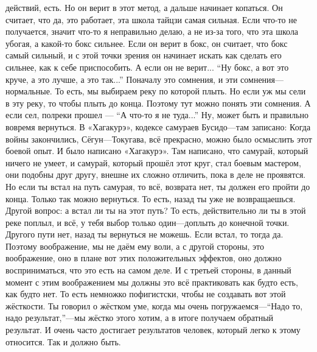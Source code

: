 действий, есть. Но он верит
в этот метод, а дальше начинает копаться. Он считает, что да, это работает, эта школа тайцзи
самая сильная. Если
что-то не получается, значит что-то я неправильно делаю, а не из-за того, что эта школа убогая, а
какой-то бокс сильнее.
Если он верит в бокс, он считает, что бокс самый сильный, и с этой точки зрения он начинает искать
как сделать его
сильнее, как к себе приспособить. А если он не верит... ``Ну бокс, а вот это круче, а это лучше, а
это так...''
Поначалу это
сомнения, и эти сомнения---нормальные. То есть, мы выбираем реку по которой плыть. Но если
уж мы сели в эту
реку, то чтобы плыть до конца. Поэтому тут можно понять эти сомнения.
А если сел, полреки
прошел --- ``А что-то я не туда...''\hfil\break
\indent
Ну, может быть и правильно вовремя вернуться. В «Хагакурэ», кодексе самураев Бусидо---там
записано: Когда
войны закончились, Сёгун---Токугава, всё прекрасно, можно было осмыслить этот боевой опыт. И было
написано «Хагакурэ».
Там написано, что самурай, который ничего не умеет, и самурай, который прошёл этот круг, стал
боевым мастером, они
подобны друг другу, внешне их сложно отличить, пока в деле не проявятся.
Но если ты встал на путь самурая, то всё, возврата нет, ты должен его
пройти до конца. Только так можно вернуться. То есть, назад ты уже не возвращаешься.
Другой вопрос: а встал ли ты на этот путь? То есть,
действительно ли ты в
этой реке поплыл, и всё, у тебя выбор только один---доплыть до конечной точки.
Другого пути нет, назад ты вернуться не можешь.
Если встал, то тогда да.\hfil\break
\indent
Поэтому воображение, мы не даём ему воли, а с другой стороны, это
воображение, оно в
плане вот этих положительных эффектов, оно должно восприниматься, что это есть на самом деле. И с
третьей стороны, в данный момент с этим воображением мы должны
это всё практиковать как будто есть, как будто нет. То есть немножко пофигистски, чтобы
не создавать вот этой жёсткости. Ты говорил о жёстком уме, когда мы очень погружаемся---``Надо
то, надо
результат,''---мы жёстко этого хотим, а в итоге получаем обратный результат.
И очень часто достигает результатов человек,
который легко к этому относится.
Так и должно быть.

\bye
